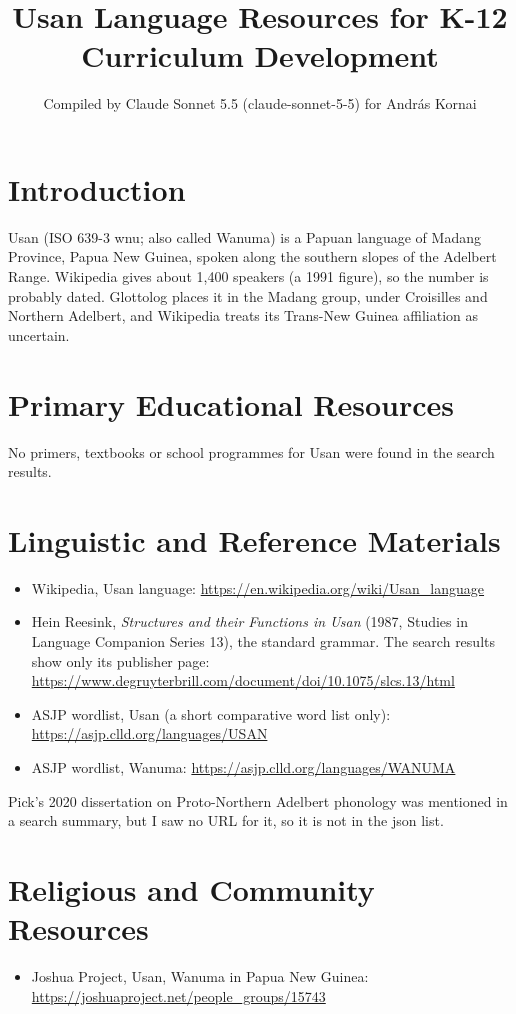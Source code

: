 \documentclass[12pt]{article}
\title{Usan Language Resources for K-12 Curriculum Development}
\author{Compiled by Claude Sonnet 5.5 (claude-sonnet-5-5) for Andr\'as Kornai}
\date{}
\begin{document}
\maketitle

\section{Introduction}
Usan (ISO 639-3 wnu; also called Wanuma) is a Papuan language of Madang Province, Papua New Guinea, spoken along the southern slopes of the Adelbert Range. Wikipedia gives about 1,400 speakers (a 1991 figure), so the number is probably dated. Glottolog places it in the Madang group, under Croisilles and Northern Adelbert, and Wikipedia treats its Trans-New Guinea affiliation as uncertain.

\section{Primary Educational Resources}
No primers, textbooks or school programmes for Usan were found in the search results.

\section{Linguistic and Reference Materials}
\begin{itemize}
\item Wikipedia, Usan language: \url{https://en.wikipedia.org/wiki/Usan_language}
\item Hein Reesink, \emph{Structures and their Functions in Usan} (1987, Studies in Language Companion Series 13), the standard grammar. The search results show only its publisher page: \url{https://www.degruyterbrill.com/document/doi/10.1075/slcs.13/html}
\item ASJP wordlist, Usan (a short comparative word list only): \url{https://asjp.clld.org/languages/USAN}
\item ASJP wordlist, Wanuma: \url{https://asjp.clld.org/languages/WANUMA}
\end{itemize}
Pick's 2020 dissertation on Proto-Northern Adelbert phonology was mentioned in a search summary, but I saw no URL for it, so it is not in the json list.

\section{Religious and Community Resources}
\begin{itemize}
\item Joshua Project, Usan, Wanuma in Papua New Guinea: \url{https://joshuaproject.net/people_groups/15743}
\end{itemize}
\end{document}
